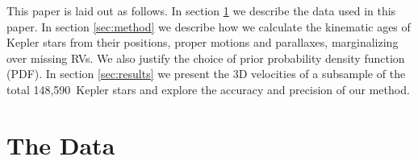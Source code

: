\documentclass[]{aastex631}
\newcommand{\nstars}{148,590}
\begin{document}

This paper is laid out as follows.
In section \ref{sec:data} we describe the data used in this paper.
In section \ref{sec:method} we describe how we calculate the kinematic ages of
Kepler stars from their positions, proper motions and parallaxes,
marginalizing over missing RVs.
We also justify the choice of prior probability density function (PDF).
In section \ref{sec:results} we present the 3D velocities of a subsample  of
the total \nstars\ Kepler stars and explore the accuracy and precision of our
method.

\section{The Data}
\label{sec:data}
\end{document}
